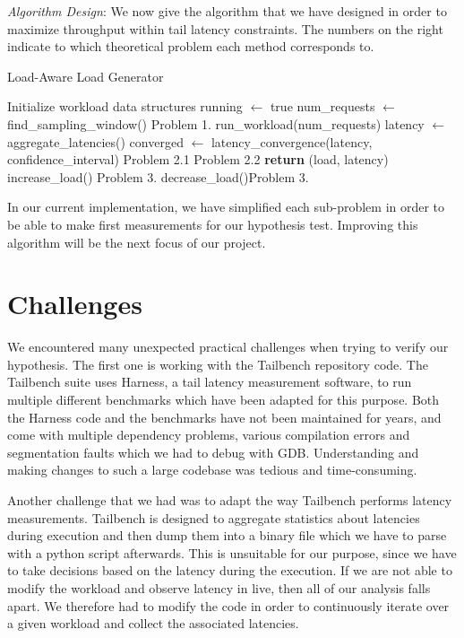 \documentclass[12pt]{article}
\begin{document}
\vspace{0.5em}
\noindent \textit{Algorithm Design}: We now give the algorithm that we have designed in order to maximize throughput within tail latency constraints. The numbers on the right indicate to which theoretical problem each method corresponds to.

\begin{algorithm}
	\caption{Load-Aware Load Generator}\label{alg:cap}
	\begin{algorithmic}[1]
		\STATE Initialize workload data structures
		\STATE running $\gets$ true
		\STATE num\_requests $\gets$ find\_sampling\_window() \hfill Problem 1.
		\STATE run\_workload(num\_requests)
		\STATE latency $\gets$ aggregate\_latencies()
		\STATE converged $\gets$ latency\_convergence(latency, confidence\_interval) \hfill Problem 2.1
		 \hfill Problem 2.2
		\STATE \textbf{return} (load, latency) 
		\STATE increase\_load() \hfill Problem 3.
		\STATE decrease\_load()\hfill Problem 3.
		\ENDIF
		\ENDIF
		\ENDWHILE
	\end{algorithmic}
\end{algorithm}

\noindent In our current implementation, we have simplified each sub-problem in order to be able to make first measurements for our hypothesis test. Improving this algorithm will be the next focus of our project.

\singlespacing


\section{Challenges}

We encountered many unexpected practical challenges when trying to verify our hypothesis. The first one is working with the Tailbench repository code. The Tailbench suite uses Harness, a tail latency measurement software, to run multiple different benchmarks which have been adapted for this purpose. Both the Harness code and the benchmarks have not been maintained for years, and come with multiple dependency problems, various compilation errors and segmentation faults which we had to debug with GDB.  Understanding and making changes to such a large codebase was tedious and time-consuming.

\singlespacing

\noindent Another challenge that we had was to adapt the way Tailbench performs latency measurements. Tailbench is designed to aggregate statistics about latencies during execution and then dump them into a binary file which we have to parse with a python script afterwards. This is unsuitable for our purpose, since we have to take decisions based on the latency during the execution. If we are not able to modify the workload and observe latency in live, then all of our analysis falls apart. We therefore had to modify the code in order to continuously iterate over a given workload and collect the associated latencies.
\end{document}
